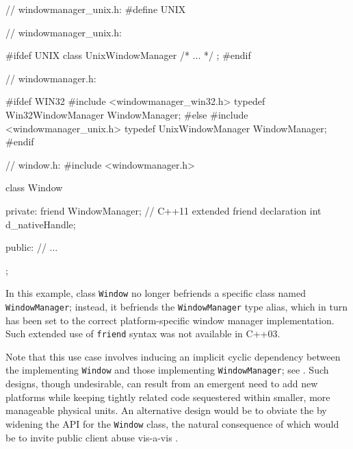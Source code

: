 \vspace*{2ex}    

\begin{emcppshiddenlisting}[emcppsbatch=e1]
// windowmanager_unix.h:
#define UNIX
\end{emcppshiddenlisting}
\begin{emcppslisting}[emcppsbatch=e1]
// windowmanager_unix.h:

#ifdef UNIX
class UnixWindowManager { /* ... */ };
#endif
\end{emcppslisting}
    
\vspace*{2ex}

\begin{emcppslisting}[emcppsbatch=e1]
// windowmanager.h:

#ifdef WIN32
#include <windowmanager_win32.h>
typedef Win32WindowManager WindowManager;
#else
#include <windowmanager_unix.h>
typedef UnixWindowManager WindowManager;
#endif
\end{emcppslisting}
    
\vspace*{2ex}

\begin{emcppslisting}[emcppsbatch=e1]
// window.h:
#include <windowmanager.h>

class Window
{
private:
    friend WindowManager;  // C++11 extended friend declaration
    int d_nativeHandle;

public:
    // ...
};
\end{emcppslisting}
   

In this example, class \lstinline!Window! no longer befriends a specific
class named \lstinline!WindowManager!; instead, it befriends the
\lstinline!WindowManager! type alias, which in turn has been set to the
correct platform-specific window manager implementation. Such extended
use of \lstinline!friend! syntax was not available in C++03.

Note that this use case involves 
inducing an implicit cyclic dependency between the 
implementing \lstinline!Window! and those implementing
\lstinline!WindowManager!; see . 
Such designs, though
undesirable, can result from an emergent need to add new platforms while
keeping tightly related code sequestered within smaller, more manageable
physical units. An alternative design would be to obviate the
 by widening the API for the
\lstinline!Window! class, the natural consequence of which would be to
invite public client abuse vis-a-vis .

